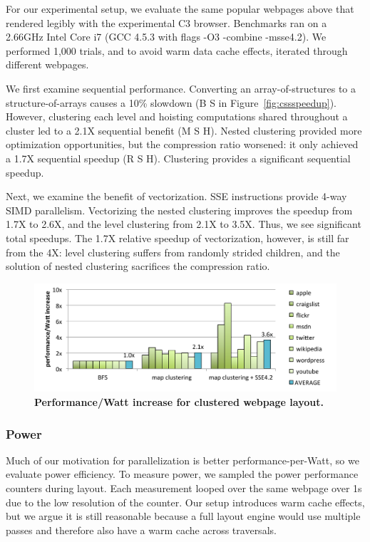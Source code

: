 For our experimental setup, we evaluate the same popular webpages above that rendered legibly with the experimental C3 browser.  Benchmarks ran on a 2.66GHz Intel Core i7 (GCC 4.5.3 with flags -O3 -combine -msse4.2). We performed 1,000 trials, and to avoid warm data cache effects, iterated through different webpages.

We first examine sequential performance. Converting an array-of-structures to a structure-of-arrays causes a 10\% slowdown (B S in Figure~\ref{fig:cssspeedup}). However, clustering each level and hoisting computations shared throughout a cluster led to a 2.1X sequential benefit (M S H). Nested clustering provided more optimization opportunities, but the compression ratio worsened: it only achieved a 1.7X sequential speedup (R S H). Clustering provides a significant sequential speedup.

Next, we examine the benefit of vectorization. SSE instructions provide 4-way SIMD parallelism. Vectorizing the nested clustering improves the speedup from 1.7X to 2.6X, and the level clustering from 2.1X to 3.5X. Thus, we see significant total speedups. The 1.7X relative speedup of vectorization, however, is still far from the 4X: level clustering suffers from randomly strided children, and the solution of nested clustering sacrifices the compression ratio.

\begin{figure}
\centering
\includegraphics[trim=0 0 0 0,clip,width=1.0\columnwidth]{chapter6/csspower}
\caption{\textbf{Performance/Watt increase for clustered webpage layout.}}
\label{fig:csspower}
\end{figure}

\subsubsection{Power}
Much of our motivation for parallelization is better performance-per-Watt, so we evaluate power efficiency. To measure power, we sampled the power performance counters during layout. Each measurement looped over the same webpage over 1s due to the low resolution of the counter. Our setup introduces warm cache effects, but we argue it is still reasonable because a full layout engine would use multiple passes and therefore also have a warm cache across traversals.

